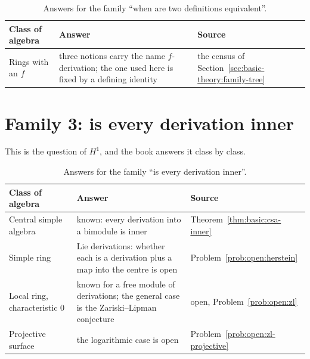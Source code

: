 \begin{table}[htbp]
  \centering
  \caption{Answers for the family ``when are two definitions equivalent''.}
  \label{tab:q:definitions}
  \begin{tabular}{p{}p{}p{}}
    \toprule
    Class of algebra & Answer & Source \\ %
    \midrule
    Rings with an $f$ & three notions carry the name $f$-derivation; the %
      one used here is fixed by a defining identity & the census of %
      Section~\ref{sec:basic-theory:family-tree} \\ %
    \bottomrule
  \end{tabular}
\end{table}

\section{Family 3: is every derivation inner}

This is the question of $H^1$, and the book answers it class by class. %

\begin{table}[htbp]
  \centering
  \caption{Answers for the family ``is every derivation inner''.}
  \label{tab:q:inner}
  \begin{tabular}{p{}p{}p{}}
    \toprule
    Class of algebra & Answer & Source \\ %
    \midrule
    Central simple algebra & known: every derivation into a bimodule is %
      inner & Theorem~\ref{thm:basic:csa-inner} \\ %
    Simple ring & Lie derivations: whether each is a derivation plus a map %
      into the centre is open & Problem~\ref{prob:open:herstein} \\ %
    Local ring, characteristic $0$ & known for a free module of derivations; %
      the general case is the Zariski--Lipman conjecture & open, %
      Problem~\ref{prob:open:zl} \\ %
    Projective surface & the logarithmic case is open & %
      Problem~\ref{prob:open:zl-projective} \\ %
    \bottomrule
  \end{tabular}
\end{table}

